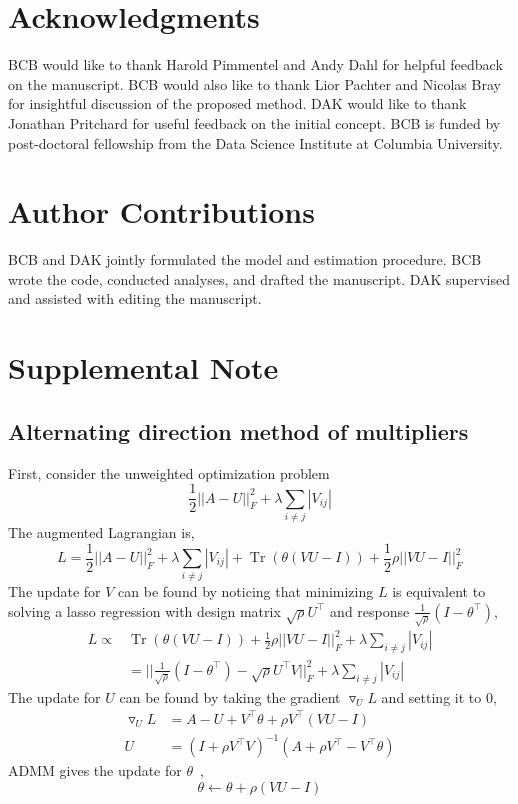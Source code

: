 \documentclass{article}
\DeclareMathOperator{\Tr}{Tr}
\newcommand{\beginsupplement}{%
        \setcounter{table}{0}
        \renewcommand{\thetable}{S\arabic{table}}%
        \setcounter{figure}{0}
        \renewcommand{\thefigure}{S\arabic{figure}}%
     }
\begin{document}
\section{Acknowledgments}
BCB would like to thank Harold Pimmentel and Andy Dahl for helpful feedback on the manuscript.
BCB would also like to thank Lior Pachter and Nicolas Bray for insightful discussion of the
proposed method. DAK would like to thank Jonathan Pritchard for useful feedback on the
initial concept. BCB is funded by post-doctoral fellowship from the Data Science Institute at
Columbia University.

\section{Author Contributions}
BCB and DAK jointly formulated the model and estimation procedure.
BCB wrote the code, conducted analyses, and drafted the manuscript.
DAK supervised and assisted with editing the manuscript.

\printbibliography

\beginsupplement
\section*{Supplemental Note}
\subsection*{Alternating direction method of multipliers}\label{note}
First, consider the unweighted optimization problem
\begin{equation}
\frac{1}{2} ||A - U||_F^2 + \lambda \sum_{i\neq j}|V_{ij}|
\end{equation}
The augmented Lagrangian is,
\begin{equation*}
L = \frac{1}{2} ||A - U||_F^2 +
   \lambda \sum_{i\neq j}|V_{ij}| +
   \Tr(\theta(VU-I)) + 
   \frac{1}{2} \rho ||VU-I||_F^2
\end{equation*}
The update for $V$ can be found by noticing that minimizing $L$ is equivalent
to solving a lasso regression with design matrix $\sqrt{\rho} U^\top$ and
response $\frac{1}{\sqrt{\rho}}(I-\theta^\top)$,
\begin{align*}
   L \propto& \Tr(\theta(VU-I)) + 
     \frac{1}{2} \rho ||VU-I||_F^2 + \lambda \sum_{i\neq j}|V_{ij}| \\
   &= ||\frac{1}{\sqrt{\rho}}(I-\theta^\top) -
      \sqrt{\rho} U^\top V||_F^2 + \lambda \sum_{i\neq j}|V_{ij}|
\end{align*}
The update for $U$ can be found by taking the gradient $\triangledown_U L$
and setting it to 0,
\begin{align*}
\triangledown_U L &= A - U + V^\top \theta + \rho V^\top(VU-I) \\
U &= (I + \rho V^{\top} V)^{-1}(A + \rho V^\top - V^\top \theta)
\end{align*}
ADMM gives the update for $\theta$~\cite{Boyd2010},
\begin{equation}
\theta \leftarrow \theta + \rho(VU-I)
\end{equation}
\end{document}

